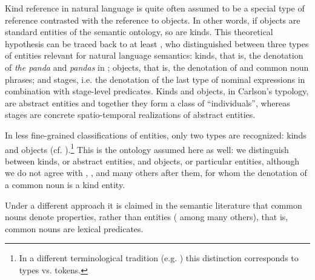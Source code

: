 \documentclass[output=paper
,modfonts
,nonflat]{langsci/langscibook}
\begin{document}
	Kind reference in natural language is quite often assumed to be a special type of reference contrasted with the reference to objects. In other words, if objects are standard entities of the semantic ontology, so are kinds. This theoretical hypothesis can be traced back to at least \citet{Carlson1977}, who distinguished between three types of entities relevant for natural language semantics: kinds, that is, the denotation of \textit{the panda} and \textit{pandas} in ; objects, that is, the denotation of  and common noun phrases; and stages, i.e. the denotation of the last type of nominal expressions in combination with stage-level predicates. Kinds and objects, in Carlson's typology, are abstract entities and together they form a class of ``individuals'', whereas stages are concrete spatio-temporal realizations of abstract entities. 
	
	In less fine-grained classifications of entities, only two types are recognized: kinds and objects (cf. \citealt{Zamparelli1995}).\footnote{In a different terminological tradition (e.g. \citealt{Vergnaud1992}) this distinction corresponds to types vs. tokens.} This is the ontology assumed here as well: we distinguish between kinds, or abstract entities, and objects, or particular entities, although we do not agree with \citet{Carlson1977}, \citet{Zamparelli1995}, and many others after them, for whom the denotation of a common noun is a kind entity. \newpage
	
	Under a different approach it is claimed in the semantic literature that common nouns denote properties, rather than entities (\citealt{Chierchia1984,Chierchia1998,Partee1987} among many others), that is, common nouns are lexical predicates. 
	
\end{document}
